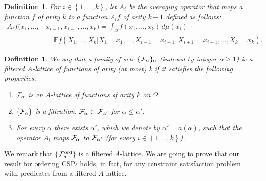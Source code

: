 \documentclass[11pt]{article}
\newcommand {\set}   [1] {\left\{ #1 \right\}}
\newcommand {\Exp}       {\mathbb{E}}
\newcommand {\calF}   {{\cal{F}}}
\newtheorem{definition}[theorem]{Definition}
\begin{document}
\begin{definition}
For $i\in \set{1,\dots, k}$, let $A_i$ be the averaging operator that maps a function $f$ of arity $k$ to a function $A_i f$ of arity $k-1$ defined as follows:
\begin{align*}
A_i f(x_1,\dots,&\, x_{i-1},x_{i+1},\dots, x_k) = \int_{\Omega} f(x_1,\dots, x_k) \,d\mu(x_i)\\
&= \Exp{f(X_1,\dots, X_k|X_1 = x_1,\dots, X_{i-1} = x_{i-1},X_{i+1} = x_{i+1},\dots, X_k = x_k)}.
\end{align*}
\end{definition}
\begin{definition}
We say that a family of sets $\{\calF_{\alpha}\}_{\alpha}$ (indexed by integer $\alpha\geq 1$) is a filtered $A$-lattice of
functions of arity (at most) $k$ if it satisfies the following properties.
\begin{enumerate}
\item $\calF_{\alpha}$ is an $A$-lattice of functions of arity $k$ on $\Omega$.
\item $\set{\calF_{\alpha}}$ is a filtration: $\calF_{\alpha} \subset \calF_{\alpha'}$ for $\alpha \leq \alpha'$.
\item For every $\alpha$ there exists $\alpha'$, which we denote by $\alpha' = a(\alpha)$, such that the operator $A_i$ maps $\calF_{\alpha}$ to $\calF_{\alpha'}$ (for every $i\in \set{1,\dots, k}$).
\end{enumerate}
\end{definition}
We remark  that $\{\calF^{\mathrm{ord}}_{d}\}$ is a filtered $A$-lattice.
We are going to prove that our result for ordering CSPs holds, in fact, for any constraint satisfaction problem with predicates from a filtered $A$-lattice.
\end{document}
